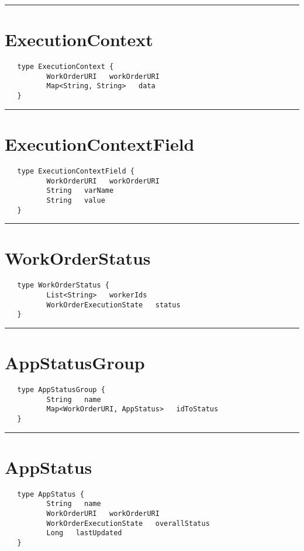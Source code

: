 \rule{15cm}{2pt}
\section{ExecutionContext}
\label{type:ExecutionContext}

\begin{verbatim}
   type ExecutionContext {
          WorkOrderURI   workOrderURI
          Map<String, String>   data
   }
\end{verbatim}

\rule{15cm}{2pt}
\section{ExecutionContextField}
\label{type:ExecutionContextField}

\begin{verbatim}
   type ExecutionContextField {
          WorkOrderURI   workOrderURI
          String   varName
          String   value
   }
\end{verbatim}

\rule{15cm}{2pt}
\section{WorkOrderStatus}
\label{type:WorkOrderStatus}

\begin{verbatim}
   type WorkOrderStatus {
          List<String>   workerIds
          WorkOrderExecutionState   status
   }
\end{verbatim}

\rule{15cm}{2pt}
\section{AppStatusGroup}
\label{type:AppStatusGroup}

\begin{verbatim}
   type AppStatusGroup {
          String   name
          Map<WorkOrderURI, AppStatus>   idToStatus
   }
\end{verbatim}

\rule{15cm}{2pt}
\section{AppStatus}
\label{type:AppStatus}

\begin{verbatim}
   type AppStatus {
          String   name
          WorkOrderURI   workOrderURI
          WorkOrderExecutionState   overallStatus
          Long   lastUpdated
   }
\end{verbatim}

